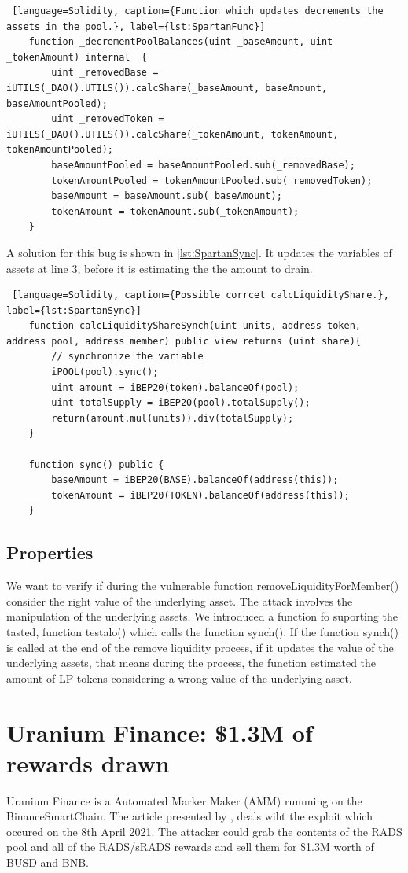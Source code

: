 \begin{lstlisting} [language=Solidity, caption={Function which updates decrements the assets in the pool.}, label={lst:SpartanFunc}]
    function _decrementPoolBalances(uint _baseAmount, uint _tokenAmount) internal  {
        uint _removedBase = iUTILS(_DAO().UTILS()).calcShare(_baseAmount, baseAmount, baseAmountPooled);
        uint _removedToken = iUTILS(_DAO().UTILS()).calcShare(_tokenAmount, tokenAmount, tokenAmountPooled);
        baseAmountPooled = baseAmountPooled.sub(_removedBase);
        tokenAmountPooled = tokenAmountPooled.sub(_removedToken); 
        baseAmount = baseAmount.sub(_baseAmount);
        tokenAmount = tokenAmount.sub(_tokenAmount); 
    }
\end{lstlisting}
A solution for this bug is shown in \autoref{lst:SpartanSync}. It updates the variables of assets at line 3, before it is estimating the 
the amount to drain.
\begin{lstlisting} [language=Solidity, caption={Possible corrcet calcLiquidityShare.}, label={lst:SpartanSync}]
    function calcLiquidityShareSynch(uint units, address token, address pool, address member) public view returns (uint share){
        // synchronize the variable
        iPOOL(pool).sync();  
        uint amount = iBEP20(token).balanceOf(pool);
        uint totalSupply = iBEP20(pool).totalSupply();
        return(amount.mul(units)).div(totalSupply);
    }

    function sync() public {
        baseAmount = iBEP20(BASE).balanceOf(address(this));
        tokenAmount = iBEP20(TOKEN).balanceOf(address(this));
    }
\end{lstlisting}
\subsection{Properties}
We want to verify if during the vulnerable function removeLiquidityForMember() consider the right value of the underlying asset. 
The attack involves the manipulation of the underlying assets. We introduced a function fo suporting the tasted, function testalo() which calls the function synch(). 
If the function synch() is called at the end of the remove liquidity process, if it updates the value of the underlying assets, that means during the process, the function 
estimated the amount of LP tokens considering a wrong value of the underlying asset. 

\section{Uranium Finance: \$1.3M of rewards drawn}   
\label{sec:Exploits:Uranium}
Uranium Finance is a Automated Marker Maker (AMM) runnning on the BinanceSmartChain.
The article presented by \citet{UraniumPM}, deals wiht the exploit which occured on the 
8th April 2021. The attacker could grab the contents of the RADS pool and all of the RADS/sRADS rewards 
and sell them for \$1.3M worth of BUSD and BNB.


